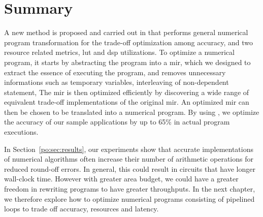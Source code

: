 \section{Summary}
\label{po:sec:conclusion}

A new method is proposed and carried out in \soap{} that performs general
numerical program transformation for the trade-off optimization among accuracy,
and two resource related metrics, \gls{lut} and \gls{dsp} utilizations.  To
optimize a numerical program, it starts by abstracting the program into a
\gls{mir}, which we designed to extract the essence of executing the program,
and removes unnecessary informations such as temporary variables, interleaving
of non-dependent statement, \etc{} The \gls{mir} is then optimized efficiently
by discovering a wide range of equivalent trade-off implementations of the
original \gls{mir}\@.  An optimized \gls{mir} can then be chosen to be
translated into a numerical program.  By using \soap, we optimize the accuracy
of our sample applications by up to 65\% in actual program executions.

In Section~\ref{po:sec:results}, our experiments show that accurate
implementations of numerical algorithms often increase their number of
arithmetic operations for reduced round-off errors.  In general, this could
result in circuits that have longer wall-clock time.  However with greater
area budget, we could have a greater freedom in rewriting programs to have
greater throughputs.  In the next chapter, we therefore explore how to optimize
numerical programs consisting of pipelined loops to trade off accuracy,
resources and latency.
